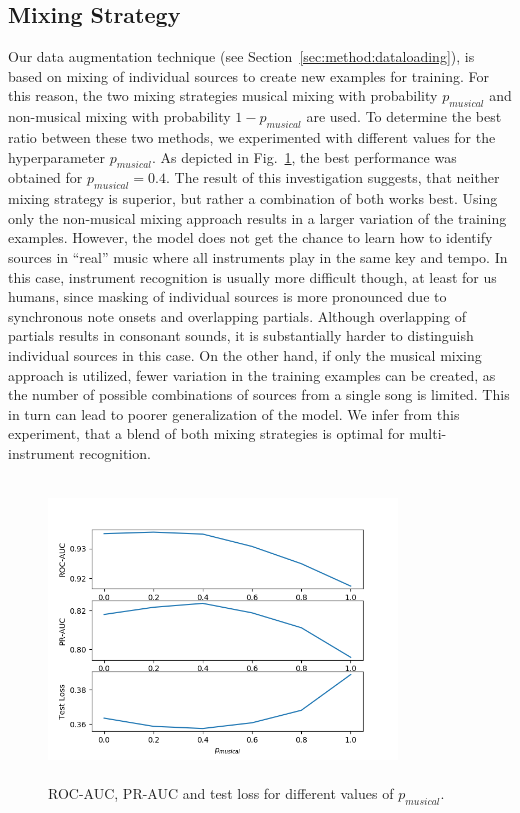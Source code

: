 \documentclass{article}
\begin{document}
\subsection{Mixing Strategy}
\label{sec:experiments:mixing}
Our data augmentation technique (see Section~\ref{sec:method:dataloading}), is based on mixing of individual sources to create new examples for training. For this reason, the two mixing strategies musical mixing with probability $p_{musical}$ and non-musical mixing with probability $1 - p_{musical}$ are used. To determine the best ratio between these two methods, we experimented with different values for the hyperparameter $p_{musical}$. As depicted in Fig.~\ref{fig:mixing-strategy}, the best performance was obtained for $p_{musical}=0.4$. The result of this investigation suggests, that neither mixing strategy is superior, but rather a combination of both works best. Using only the non-musical mixing approach results in a larger variation of the training examples. However, the model does not get the chance to learn how to identify sources in \enquote{real} music where all instruments play in the same key and tempo. In this case, instrument recognition is usually more difficult though, at least for us humans, since masking of individual sources is more pronounced due to synchronous note onsets and overlapping partials. Although overlapping of partials results in consonant sounds, it is substantially harder to distinguish individual sources in this case. On the other hand, if only the musical mixing approach is utilized, fewer variation in the training examples can be created, as the number of possible combinations of sources from a single song is limited. This in turn can lead to poorer generalization of the model. We infer from this experiment, that a blend of both mixing strategies is optimal for multi-instrument recognition.
\begin{figure}[t]
	\begin{minipage}[b]{0.8\linewidth}
		\centering
		\centerline{\includegraphics[width=9.25cm,height=8.0cm]{p_mult_songs-experiment.png}}
	\end{minipage}
	\centering
	\vspace*{-0.6cm}
	\caption{ROC-AUC, PR-AUC and test loss for different values of $p_{musical}$.}
	\label{fig:mixing-strategy}
	\vspace*{-0.05cm}	
\end{figure}
\end{document}
